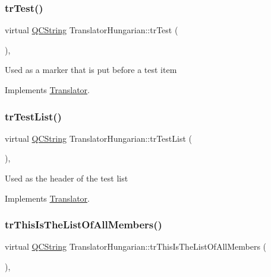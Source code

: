 \subsubsection{\texorpdfstring{trTest()}{trTest()}}
{\footnotesize\ttfamily virtual \mbox{\hyperlink{class_q_c_string}{Q\+C\+String}} Translator\+Hungarian\+::tr\+Test (\begin{DoxyParamCaption}{ }\end{DoxyParamCaption})\hspace{0.3cm}{\ttfamily [inline]}, {\ttfamily [virtual]}}

Used as a marker that is put before a test item 

Implements \mbox{\hyperlink{class_translator}{Translator}}.

\mbox{\label{class_translator_hungarian_a82b3b3bd042d5b2d7d1426e466ef07b6}} 
\subsubsection{\texorpdfstring{trTestList()}{trTestList()}}
{\footnotesize\ttfamily virtual \mbox{\hyperlink{class_q_c_string}{Q\+C\+String}} Translator\+Hungarian\+::tr\+Test\+List (\begin{DoxyParamCaption}{ }\end{DoxyParamCaption})\hspace{0.3cm}{\ttfamily [inline]}, {\ttfamily [virtual]}}

Used as the header of the test list 

Implements \mbox{\hyperlink{class_translator}{Translator}}.

\mbox{\label{class_translator_hungarian_adf8c8aa3a1a7a399b106ed85e1824b3f}} 
\subsubsection{\texorpdfstring{trThisIsTheListOfAllMembers()}{trThisIsTheListOfAllMembers()}}
{\footnotesize\ttfamily virtual \mbox{\hyperlink{class_q_c_string}{Q\+C\+String}} Translator\+Hungarian\+::tr\+This\+Is\+The\+List\+Of\+All\+Members (\begin{DoxyParamCaption}{ }\end{DoxyParamCaption})\hspace{0.3cm}{\ttfamily [inline]}, {\ttfamily [virtual]}}

